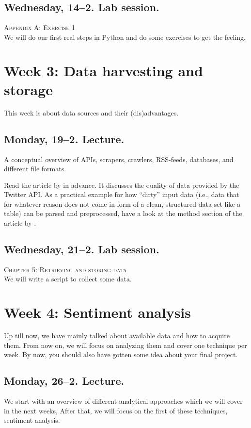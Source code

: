 \documentclass[a4paper,12pt]{report}
\begin{document}
\subsection*{Wednesday, 14--2. Lab session.}
\textsc{ Appendix A: Exercise 1}\\
We will do our first real steps in Python and do some exercises to get the feeling. 


\section*{Week 3: Data harvesting and storage}
This week is about data sources and their (dis)advantages. 

\subsection*{Monday, 19--2. Lecture.}
A conceptual overview of APIs, scrapers, crawlers, RSS-feeds, databases, and different file formats.

Read the article by \cite{Morstatter2013} in advance. It discusses the quality of data provided by the Twitter API. As a practical example for how ``dirty'' input data (i.e., data that for whatever reason does not come in form of a clean, structured data set like a table) can be parsed and preprocessed, have a look at the method section of the article by \citep{Lewis2013}. 


\subsection*{Wednesday, 21--2. Lab session.}
\textsc{ Chapter 5: Retrieving and storing data}\\
We will write a script to collect some data. 




\section*{Week 4: Sentiment analysis}
Up till now, we have mainly talked about available data and how to acquire them. From now on, we will focus on analyzing them and cover one technique per week. By now, you should also have gotten some idea about your final project.


\subsection*{Monday, 26--2. Lecture.}
We start with an overview of different analytical approaches which we will cover in the next weeks, After that, we will focus on the first of these techniques, sentiment analysis.
\end{document}
